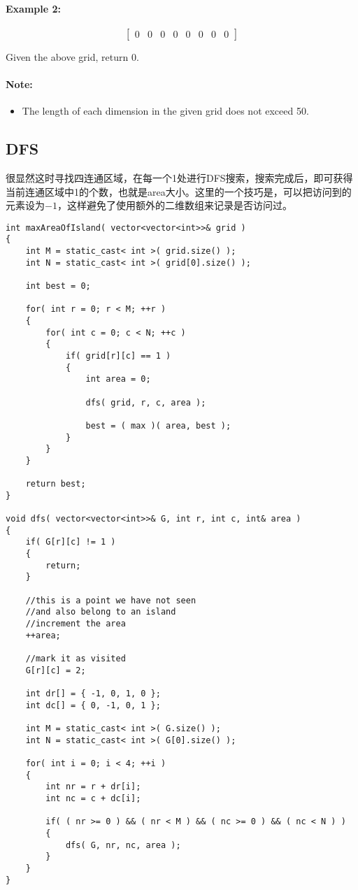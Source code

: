 \paragraph{Example 2:}
\begin{flushleft}
\[
\begin{bmatrix}
0 & 0 & 0 & 0 & 0 & 0 & 0 & 0
\end{bmatrix}
\]

Given the above grid, return 0.
\end{flushleft}

\paragraph{Note:}
\begin{itemize}
\item The length of each dimension in the given grid does not exceed 50.
\end{itemize}

\subsection{DFS}

很显然这时寻找四连通区域，在每一个1处进行DFS搜索，搜索完成后，即可获得当前连通区域中1的个数，也就是area大小。这里的一个技巧是，可以把访问到的元素设为$-1$，这样避免了使用额外的二维数组来记录是否访问过。

\setcounter{lstlisting}{0}
\begin{lstlisting}[style=customc, caption={DFS}]
int maxAreaOfIsland( vector<vector<int>>& grid )
{
    int M = static_cast< int >( grid.size() );
    int N = static_cast< int >( grid[0].size() );

    int best = 0;

    for( int r = 0; r < M; ++r )
    {
        for( int c = 0; c < N; ++c )
        {
            if( grid[r][c] == 1 )
            {
                int area = 0;

                dfs( grid, r, c, area );

                best = ( max )( area, best );
            }
        }
    }

    return best;
}

void dfs( vector<vector<int>>& G, int r, int c, int& area )
{
    if( G[r][c] != 1 )
    {
        return;
    }

    //this is a point we have not seen
    //and also belong to an island
    //increment the area
    ++area;

    //mark it as visited
    G[r][c] = 2;

    int dr[] = { -1, 0, 1, 0 };
    int dc[] = { 0, -1, 0, 1 };

    int M = static_cast< int >( G.size() );
    int N = static_cast< int >( G[0].size() );

    for( int i = 0; i < 4; ++i )
    {
        int nr = r + dr[i];
        int nc = c + dc[i];

        if( ( nr >= 0 ) && ( nr < M ) && ( nc >= 0 ) && ( nc < N ) )
        {
            dfs( G, nr, nc, area );
        }
    }
}
\end{lstlisting}